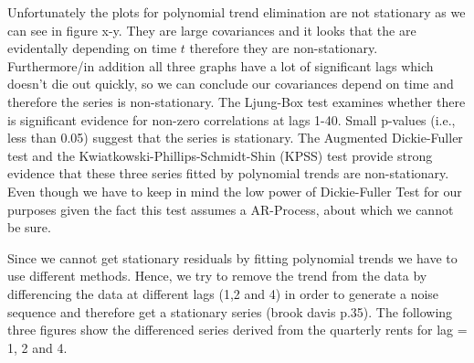 \documentclass[11pt,a4paper]{article}
\begin{document}
{Unfortunately the plots for polynomial trend elimination are not stationary as we can see in figure x-y. They are large covariances and it looks that the are evidentally depending on time $t$ therefore they are non-stationary. Furthermore/in addition all three graphs have a lot of significant lags which  doesn't die out quickly, so we can conclude our covariances depend on time and therefore the series is non-stationary. The Ljung-Box test examines whether there is significant evidence for non-zero correlations at lags 1-40. Small p-values (i.e., less than 0.05) suggest that the series is stationary. The Augmented Dickie-Fuller test and the Kwiatkowski-Phillips-Schmidt-Shin (KPSS) test provide strong evidence that these three series fitted by polynomial trends are non-stationary. Even though we have to keep in mind the low power of Dickie-Fuller Test for our purposes given the fact this test assumes a AR-Process, about which we cannot be sure.

Since we cannot get stationary residuals by fitting polynomial trends we have to use different methods. Hence, we try to remove the trend from the data by differencing the data at different lags (1,2 and 4) in order to generate a noise sequence and therefore get a stationary series (brook davis p.35). The following three figures show the differenced series derived from the quarterly rents for lag = 1, 2 and 4.

}
\end{document}
